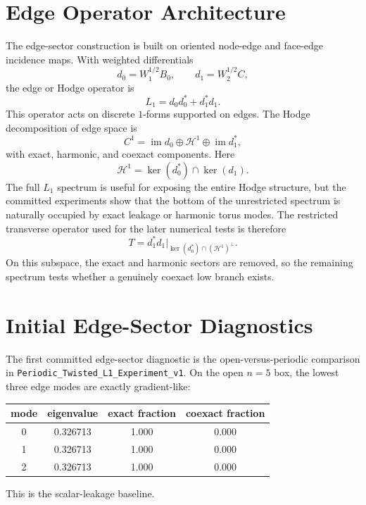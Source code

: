 \documentclass[11pt]{article}
\begin{document}
\section{Edge Operator Architecture}
The edge-sector construction is built on oriented node-edge and face-edge incidence maps. With weighted differentials
\begin{equation}
 d_0 = W_1^{1/2} B_0,
 \qquad
 d_1 = W_2^{1/2} C,
\end{equation}
the edge or Hodge operator is
\begin{equation}
L_1 = d_0 d_0^* + d_1^* d_1.
\end{equation}
This operator acts on discrete $1$-forms supported on edges. The Hodge decomposition of edge space is
\begin{equation}
C^1 = \operatorname{im} d_0 \oplus \mathcal{H}^1 \oplus \operatorname{im} d_1^*,
\end{equation}
with exact, harmonic, and coexact components. Here
\begin{equation}
\mathcal{H}^1 = \ker(d_0^*) \cap \ker(d_1).
\end{equation}
The full $L_1$ spectrum is useful for exposing the entire Hodge structure, but the committed experiments show that the bottom of the unrestricted spectrum is naturally occupied by exact leakage or harmonic torus modes. The restricted transverse operator used for the later numerical tests is therefore
\begin{equation}
T = d_1^* d_1\big|_{\ker(d_0^*) \cap (\mathcal{H}^1)^\perp}.
\end{equation}
On this subspace, the exact and harmonic sectors are removed, so the remaining spectrum tests whether a genuinely coexact low branch exists.

\section{Initial Edge-Sector Diagnostics}
The first committed edge-sector diagnostic is the open-versus-periodic comparison in \texttt{Periodic\_Twisted\_L1\_Experiment\_v1}. On the open $n=5$ box, the lowest three edge modes are exactly gradient-like:
\begin{center}
\begin{tabular}{cccc}
\toprule
mode & eigenvalue & exact fraction & coexact fraction \\
\midrule
0 & 0.326713 & 1.000 & 0.000 \\
1 & 0.326713 & 1.000 & 0.000 \\
2 & 0.326713 & 1.000 & 0.000 \\
\bottomrule
\end{tabular}
\end{center}
This is the scalar-leakage baseline.
\end{document}
